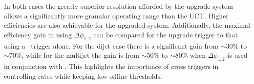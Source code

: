 In both cases the greatly superior resolution afforded by the upgrade system allows a significantly
more granular operating range than the UCT. Higher efficiencies are also achievable for 
the upgraded system. Additionally, the maximal efficiency gain in using $\Delta\phi_{1,2}$ can be compared for the upgrade trigger
to that using a \scalht~trigger alone. For the dijet case there is a significant gain from $\sim 30\%$ to $\sim 70\%$, while for
the multijet the gain is from $\sim 50\%$ to $\sim 80\%$ when $\Delta\phi_{1,2}$ is used in conjunction with \scalht.
This highlights the importance of cross triggers in controlling rates while keeping low offline thresholds.
%
%

